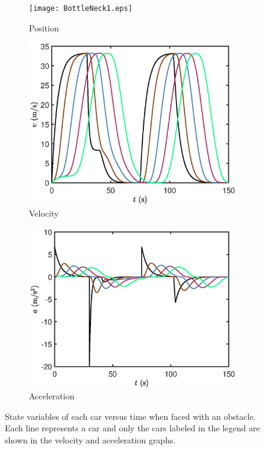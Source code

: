 \documentclass[12pt]{article}
\begin{document}
  \begin{figure}[H]
      \centering
        \begin{subfigure}[H]{.49\textwidth}
        \texttt{[image: BottleNeck1.eps]}
        \centering
        \caption{Position}
      \end{subfigure}
      \hfill
      \begin{subfigure}[H]{.47\textwidth}
        \includegraphics[width=\linewidth]{BottleNeck2.eps}
        \centering
        \caption{Velocity}
      \end{subfigure}

        \begin{subfigure}[H]{.47\textwidth}
          \includegraphics[width=\linewidth]{BottleNeck3.eps}
          \centering
          \caption{Acceleration}
        \end{subfigure}
        \caption{State variables of each car versus time when faced with an obstacle. Each line represents a car and only the cars labeled in the legend are shown in the velocity and acceleration graphs.}
      \label{fig:obstacle}
  \end{figure}
\end{document}
